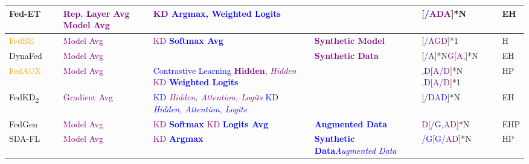 \begin{table}[htp]
\begin{longtable}{|p{1.68cm}|p{1.2cm}|p{1.25cm}|p{5.0cm}|p{2.59cm}|p{1.2cm}|p{0.35cm}|}
    Fed-ET~\cite{cho2022heterogeneous} & & \textcolor{purple}{Rep. Layer Avg} \newline \textcolor{purple}{Model Avg}  & \textcolor{purple}{KD} \textcolor{blue}{\textbf{Argmax, Weighted Logits}} & & [\textcolor{blue}{/}\textcolor{purple}{ADA}]*N & EH \\ \hline

    \textcolor{orange}{FedBE}~\cite{chen2020fedbe} & & \textcolor{purple}{Model Avg} & \textcolor{purple}{KD} \textcolor{blue}{\textbf{Softmax Avg}} & \textcolor{purple}{\textbf{Synthetic Model}} & [\textcolor{blue}{/}\textcolor{purple}{AGD}]*1 & H \\ \hline %

    DynaFed~\cite{pi2022dynafed} & & \textcolor{purple}{Model Avg} & & \textcolor{purple}{\textbf{Synthetic Data}} & [\textcolor{blue}{/}\textcolor{purple}{A}]*N\textcolor{purple}{G}[\textcolor{purple}{A,}]*N & EH \\ \hline

    \textcolor{orange}{FedAUX}~\cite{sattler2021fedaux}& & \textcolor{purple}{Model Avg} & \textcolor{blue}{Contrastive Learning} \textcolor{purple}{\textbf{Hidden}, \textit{Hidden}} \newline \textcolor{purple}{KD} \textcolor{blue}{\textbf{Weighted Logits}} & & \textcolor{purple}{,}\textcolor{blue}{D}[\textcolor{purple}{A\textcolor{blue}{/}D}]*N \newline \textcolor{purple}{,}\textcolor{blue}{D}[\textcolor{purple}{A\textcolor{blue}{/}D}]*1 & HP \\ \hline %
    
    FedKD\textsubscript{2}~\cite{wu2022communication} & & \textcolor{purple}{Gradient Avg} & \textcolor{blue}{KD} \textcolor{purple}{\textit{Hidden, Attention, Logits}} \textcolor{blue}{KD} \textcolor{blue}{\textit{Hidden, Attention, Logits}} & & [\textcolor{blue}{/D}\textcolor{purple}{A}\textcolor{blue}{D}]*N & EH \\ \hline %

    FedGen~\cite{zhu2021data} & & \textcolor{purple}{Model Avg} &\textcolor{purple}{KD} \textcolor{blue}{\textbf{Softmax}} \textcolor{purple}{KD} \textcolor{blue}{\textbf{Logits Avg}} & \textcolor{blue}{\textbf{Augmented Data}} & \textcolor{purple}{D}[\textcolor{blue}{/G,}\textcolor{purple}{AD}]*N & EHP \\ \hline %

    SDA-FL~\cite{liz2022federated} & & \textcolor{purple}{Model Avg} & \textcolor{purple}{KD} \textcolor{blue}{\textbf{Argmax}} & \textcolor{blue}{\textbf{Synthetic Data}}\newline  \textcolor{blue}{\textit{Augmented Data}} & \textcolor{blue}{/G}[\textcolor{blue}{G/}\textcolor{purple}{AD}]*N & HP \\ \hline


\end{longtable}
\end{table}

